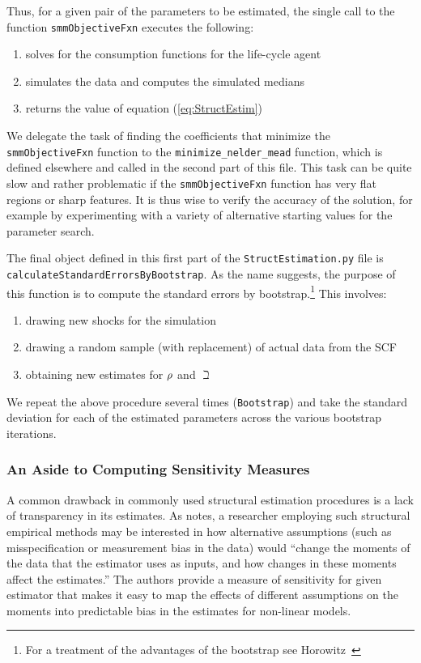 Thus, for a given pair of the parameters to be estimated, the single
call to the function \texttt{smmObjectiveFxn} executes the following:
\begin{enumerate}
\item solves for the consumption functions for the life-cycle agent
\item simulates the data and computes the simulated medians
\item returns the value of equation (\ref{eq:StructEstim})
\end{enumerate}

We delegate the task of finding the coefficients that minimize the \texttt{smmObjectiveFxn} function to the \texttt{minimize\_nelder\_mead} function, which is defined elsewhere and called in the second part of this file.  This task can be quite slow and rather problematic if the \texttt{smmObjectiveFxn} function has very flat regions or sharp features. It is thus wise to verify the accuracy of the solution, for example by experimenting with a variety of alternative starting values for the parameter search.

The final object defined in this first part of the \texttt{StructEstimation.py}
file is \texttt{calculateStandardErrorsByBootstrap}. As the name suggests, the
purpose of this function is to compute the standard errors by bootstrap.\footnote{For a
  treatment of the advantages of the bootstrap see
  Horowitz~\citeyearpar{horowitzBootstrap}} This involves:
\begin{enumerate}
\item drawing new shocks for the simulation
\item drawing a random sample (with replacement) of actual data from the SCF
\item obtaining new estimates for $\rho$ and $\beth$
\end{enumerate}
We repeat the above procedure several times (\texttt{Bootstrap}) and
take the standard deviation for each of the estimated parameters across the various bootstrap iterations.

\hypertarget{sensitivity-measures}{}
\subsubsection{An Aside to Computing Sensitivity Measures}\label{subsubsec:sensmeas}


A common drawback in commonly used structural estimation procedures is a lack of transparency in its estimates.  As \cite{andrews2017measuring} notes, a researcher employing such structural empirical methods may be interested in how alternative assumptions (such as misspecification or measurement bias in the data) would ``change the moments of the data that the estimator uses as inputs, and how changes in these moments affect the estimates.'' The authors provide a measure of sensitivity for given estimator that makes it easy to map the effects of different assumptions on the moments into predictable bias in the estimates for non-linear models.

